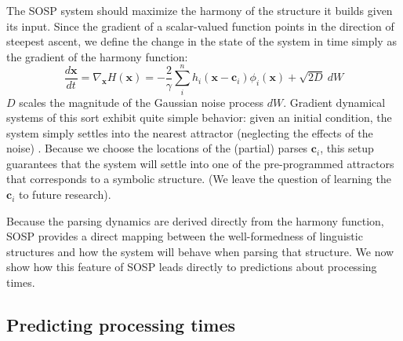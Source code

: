 \documentclass[10pt,letterpaper]{article}
\begin{document}
The SOSP system should maximize the harmony of the structure it builds given its input. Since the gradient of a scalar-valued function points in the direction of steepest ascent, we define the change in the state of the system in time simply as the gradient of the harmony function:
\begin{equation}\label{dyn}
\frac{d\mathbf{x}}{dt} = \nabla_\mathbf{x} H(\mathbf{x}) = -\frac{2}{\gamma} \sum_{i}^{n} h_i (\mathbf{x} - \mathbf{c}_i) \phi_i(\mathbf{x}) + \sqrt{2D}\ dW
\end{equation}
$D$ scales the magnitude of the Gaussian noise process $dW$. Gradient dynamical systems of this sort exhibit quite simple behavior: given an initial condition, the system simply settles into the nearest attractor (neglecting the effects of the noise) \cite{hirsch1974differential}. Because we choose the locations of the (partial) parses $\mathbf{c}_i$, this setup guarantees that the system will settle into one of the pre-programmed attractors that corresponds to a symbolic structure. (We leave the question of learning the $\mathbf{c}_i$ to future research).

Because the parsing dynamics are derived directly from the harmony function, SOSP provides a direct mapping between the well-formedness of linguistic structures and how the system will behave when parsing that structure. We now show how this feature of SOSP leads directly to predictions about processing times.

\subsection{Predicting processing times}
\end{document}
